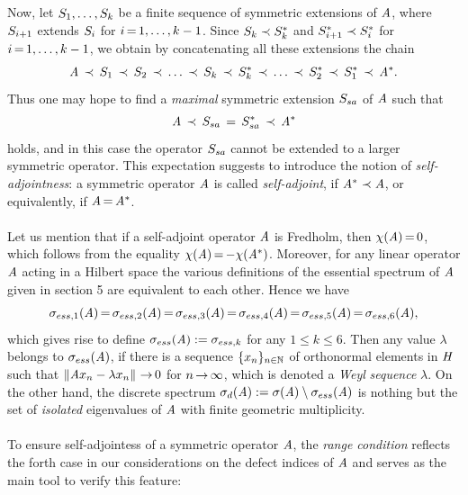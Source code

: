 \documentclass[11pt,twoside]{article}
\begin{document}
\subparagraph{}
Now,
let ${S}_1,\ldots,{S}_k$ be a finite sequence
of symmetric extensions of $\mathit{A}$,
where ${S}_{i+1}$ extends ${S}_i$ for $i {\,=\,} 1,\ldots,k-1$.
Since ${S}_k \prec {S}_k^*$ and
${S}_{i+1}^* \prec {S}_i^*$ for $i {\,=\,} 1,\ldots,k-1$,
we obtain by concatenating all these extensions the chain
\[
\mathit{A} \, \prec \, {S}_1
\, \prec \,
{S}_2
\, \prec \,
\ldots
\, \prec \,
{S}_k
\, \prec \,
{S}_k^*
\, \prec \,
\ldots
\, \prec \,
{S}_2^*
\, \prec \,
{S}_1^*
\, \prec \,
\mathit{A}^*.
\]
Thus one may hope to find a \textit{maximal} symmetric extension
${S}_{sa}$ of $\mathit{A}$ such that
\[
\mathit{A} \, \prec \, {S}_{sa} \,=\, {S}_{sa}^* \, \prec \, \mathit{A}^*
\]
holds,
and in this case
the operator ${S}_{sa}$ cannot be extended to a larger symmetric operator.
This expectation suggests to introduce the notion of \textit{self-adjointness}:
a symmetric operator $\mathit{A}$ is called \textit{self-adjoint},
if $\mathit{A}^* \prec \mathit{A}$,
or equivalently,
if $\mathit{A} {\,=\,} \mathit{A}^*$.

\paragraph{} %
Let us mention
that if a self-adjoint operator $\mathit{A}$ is Fredholm,
then $\chi(\mathit{A}) {\,=\,} 0$,
which follows from the equality $\chi(\mathit{A}) {\,=\,} {-} \chi(\mathit{A}^*)$.
Moreover,
for any linear operator $\mathit{A}$ acting in a Hilbert space
the various definitions of the essential spectrum of $\mathit{A}$
given in section 5 are equivalent to each other.
Hence we have
\[
\sigma_{ess,1}(\mathit{A})  {\,=\,}
\sigma_{ess,2}(\mathit{A})  {\,=\,}
\sigma_{ess,3}(\mathit{A})  {\,=\,}
\sigma_{ess,4}(\mathit{A})  {\,=\,}
\sigma_{ess,5}(\mathit{A})  {\,=\,}
\sigma_{ess,6}(\mathit{A}),
\]
which gives rise to define $\sigma_{ess}(\mathit{A}) := \sigma_{ess,k}$
for any $1 \leq k \leq 6$.
Then any value $\lambda$ belongs to $\sigma_{ess}(\mathit{A})$,
if there is a sequence $\{x_n\}_{n \in {\mathbb{N}}}$ of orthonormal elements in $\mathit{H}$
such that $\left\lVert \mathit{A} x_n - \lambda x_n \right\rVert {\,\to\,} 0$ for $n {\,\to\,} \infty$,
which is denoted a \textit{Weyl} \textit{sequence} {\wrt} $\lambda$.
On the other hand,
the discrete spectrum
$\sigma_d(\mathit{A}) := \sigma(\mathit{A}) \setminus \sigma_{ess}(\mathit{A})$
is nothing but the set of \textit{isolated} eigenvalues of $\mathit{A}$
with finite geometric multiplicity.

\paragraph{} %
To ensure self-adjointess of a symmetric operator $\mathit{A}$,
the \textit{range condition} reflects the forth case in our considerations
on the defect indices of $\mathit{A}$
and serves as the main tool to verify this feature:
\end{document}

